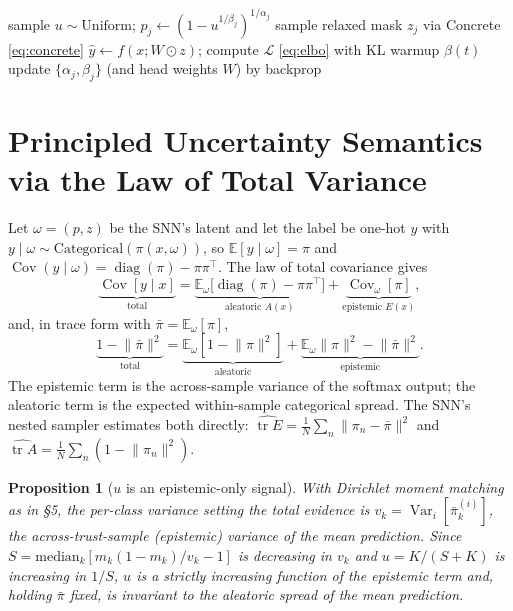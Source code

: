 \documentclass[11pt]{article}
\newtheorem{proposition}{Proposition}
\newcommand{\Eb}{\mathbb{E}}
\newcommand{\Var}{\operatorname{Var}}
\newcommand{\Cov}{\operatorname{Cov}}
\newcommand{\diag}{\operatorname{diag}}
\begin{document}
\begin{algorithm}[t]
\caption{SNN training (one minibatch)}
\begin{algorithmic}[1]
\State sample $u\sim\mathrm{Uniform}$; $p_j\!\leftarrow\!(1-u^{1/\beta_j})^{1/\alpha_j}$ 
\State sample relaxed mask $z_j$ via Concrete \eqref{eq:concrete}
\State $\hat y\!\leftarrow\! f(x;W\odot z)$; compute $\mathcal L$ \eqref{eq:elbo} with KL warmup $\beta(t)$
\State update $\{\alpha_j,\beta_j\}$ (and head weights $W$) by backprop
\end{algorithmic}
\end{algorithm}

\section{Principled Uncertainty Semantics via the Law of Total Variance}
\label{sec:lotv}
Let $\omega=(p,z)$ be the SNN's latent and let the label be one-hot $y$ with
$y\mid\omega\sim\mathrm{Categorical}(\pi(x,\omega))$, so $\Eb[y\mid\omega]=\pi$ and
$\Cov(y\mid\omega)=\diag(\pi)-\pi\pi^\top$. The law of total covariance
\citep{kwon2020,depeweg2018} gives
\begin{equation}
\underbrace{\Cov[y\mid x]}_{\text{total}}
=\underbrace{\Eb_\omega\!\big[\diag(\pi)-\pi\pi^\top\big]}_{\text{aleatoric }A(x)}
+\underbrace{\Cov_\omega[\pi]}_{\text{epistemic }E(x)},
\label{eq:lotv}
\end{equation}
and, in trace form with $\bar\pi=\Eb_\omega[\pi]$,
\begin{equation}
\underbrace{1-\lVert\bar\pi\rVert^2}_{\text{total}}
=\underbrace{\Eb_\omega[1-\lVert\pi\rVert^2]}_{\text{aleatoric}}
+\underbrace{\Eb_\omega\lVert\pi\rVert^2-\lVert\bar\pi\rVert^2}_{\text{epistemic}} .
\label{eq:lotv-trace}
\end{equation}
The epistemic term is the across-sample variance of the softmax output; the aleatoric
term is the expected within-sample categorical spread. The SNN's nested sampler
estimates both directly:
$\widehat{\operatorname{tr}E}=\tfrac1N\sum_n\lVert\pi_n-\bar\pi\rVert^2$ and
$\widehat{\operatorname{tr}A}=\tfrac1N\sum_n(1-\lVert\pi_n\rVert^2)$.

\begin{proposition}[$u$ is an epistemic-only signal]
\label{prop:u}
With Dirichlet moment matching as in \S5, the per-class variance setting the total
evidence is $v_k=\Var_i[\bar\pi^{(i)}_k]$, the across-trust-sample (epistemic) variance
of the mean prediction. Since $S=\mathrm{median}_k[m_k(1-m_k)/v_k-1]$ is decreasing in
$v_k$ and $u=K/(S+K)$ is increasing in $1/S$, $u$ is a strictly increasing function of
the epistemic term and, holding $\bar\pi$ fixed, is invariant to the aleatoric spread of
the mean prediction.
\end{proposition}
\end{document}
